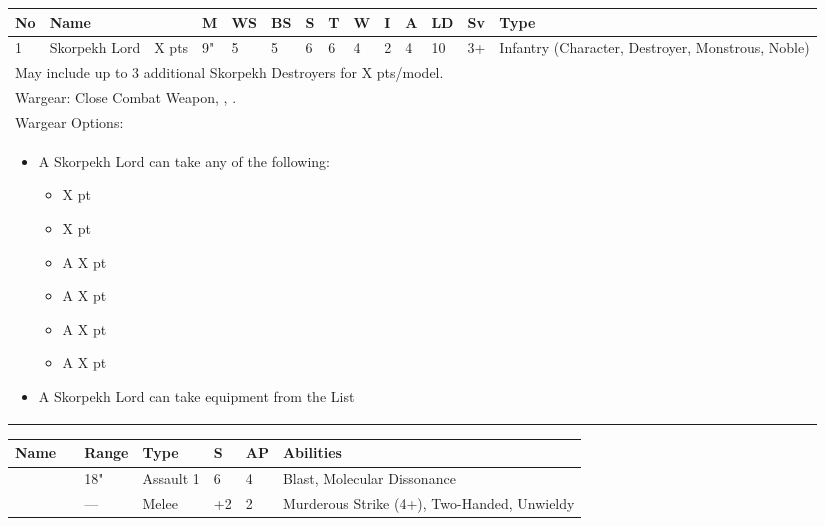 \noindent
\begin{tabular}{||m{10pt} m{95pt} m{30pt} m{11pt} m{11pt} m{11pt} m{11pt} m{11pt} m{11pt} m{11pt} m{11pt} m{11pt} m{11pt} m{125pt}||}
	\hline
	No & Name & & M & WS & BS & S & T & W & I & A & LD & Sv & Type \\
	\hline
	1 & Skorpekh Lord & X pts & 9" & 5 & 5 & 6 & 6 & 4 & 2 & 4 & 10 & 3+ & Infantry (Character, Destroyer, Monstrous, Noble) \\
	\hline
	\hline
	\multicolumn{14}{||Z{532 pt}||}{May include up to 3 additional Skorpekh Destroyers for X pts/model.}\\	
	\hline
	\hline
	\multicolumn{14}{||Z{532 pt}||}{Wargear: Close Combat Weapon, \quickref{Enmitic Annihilator}, \quickref{Hyperphase Harvester}.} \\
	\multicolumn{14}{||Z{532 pt}||}{Wargear Options:} \\	\multicolumn{14}{||Z{532 pt}||}{\begin{itemize}
			\item A Skorpekh Lord can take any of the following:
			\begin{itemize}
				\item \quickref{Flensing Scarabs} \hrulefill X pt
				\item \quickref{Mindshackle Scarabs} \hrulefill X pt
				\item A \quickref{Phase Shifter} \hrulefill X pt
				\item A \quickref{Phylactery} \hrulefill X pt
				\item A \quickref{Sempiternal Weave} \hrulefill X pt
				\item A \quickref{Shadow Ankh} \hrulefill X pt
			\end{itemize}
			\item A Skorpekh Lord can take equipment from the \quickref{Artefacts of the Aeons} List
	\end{itemize}} \\
	\hline
\end{tabular}

\noindent
\begin{tabular}{||m{110pt} m{30pt} m{31pt} m{55pt} m{12pt} m{12pt} m{210pt}||}
	\hline
	Name & & Range & Type & S & AP & Abilities \\
	\hline
	\quickref{Enmitic Annihilator} &  & 18" & Assault 1 & 6 & 4 & Blast, Molecular Dissonance \\
	\quickref{Hyperphase Harvester} &  & — & Melee & +2 & 2 & Murderous Strike (4+), Two-Handed, Unwieldy \\
	\hline
\end{tabular}

